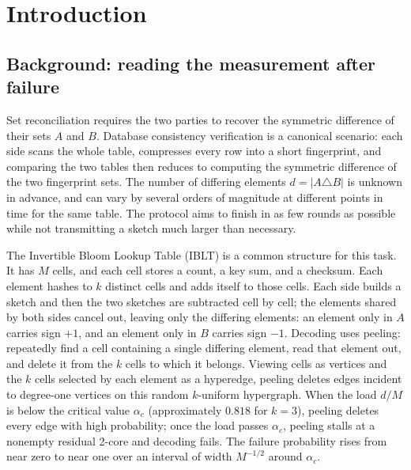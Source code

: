\section{Introduction}
\subsection{Background: reading the measurement after failure}
Set reconciliation requires the two parties to recover the symmetric difference of their sets $A$ and $B$.
Database consistency verification is a canonical scenario: each side scans the whole table, compresses every row into a short fingerprint, and comparing the two tables then reduces to computing the symmetric difference of the two fingerprint sets. The number of differing elements $d=|A\triangle B|$ is unknown in advance,
and can vary by several orders of magnitude at different points in time for the same table. The protocol aims to finish in as few rounds as possible while not transmitting a sketch much larger than necessary.

The Invertible Bloom Lookup Table (IBLT) is a common structure for this task. It has $M$ cells, and each cell
stores a count, a key sum, and a checksum. Each element hashes to $k$ distinct cells and adds itself to those cells. Each side builds a
sketch and then the two sketches are subtracted cell by cell; the elements shared by both sides cancel out, leaving only the differing elements: an element only in $A$ carries sign $+1$, and an element only in $B$
carries sign $-1$. Decoding uses peeling: repeatedly find a cell containing a single differing element, read that element out, and delete it from the $k$ cells
to which it belongs. Viewing cells as vertices and the $k$ cells selected by each element as a hyperedge, peeling deletes edges incident to degree-one vertices on this random $k$-uniform
hypergraph. When the load $d/M$ is below the critical value $\alpha_c$ (approximately $0.818$ for $k=3$\cite{molloy,dw}), peeling deletes every edge with high probability; once the load passes $\alpha_c$,
peeling stalls at a nonempty residual 2-core and decoding fails. The failure probability rises from near zero to near one over an interval of width $M^{-1/2}$
around $\alpha_c$.

